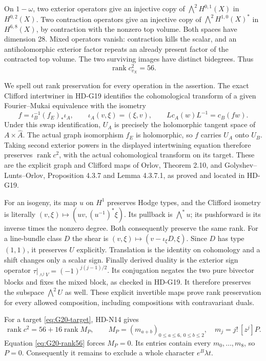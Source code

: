 On \(1-\omega\), two exterior operators give an injective copy of
\(\bigwedge^2H^{0,1}(X)\) in \(H^{0,2}(X)\). Two contraction
operators give an injective copy of
\(\bigwedge^2H^{1,0}(X)^*\) in \(H^{6,8}(X)\), by contraction
with the nonzero top volume. Both spaces have dimension 28. Mixed
operators vanish: contraction kills the scalar, and an antiholomorphic
exterior factor repeats an already present factor of the contracted
top volume. The two surviving images have distinct bidegrees. Thus
\begin{equation}\label{eq:G20-rank56}
                  \operatorname{rank}c^2_{v_X}=56.
\end{equation}

We spell out rank preservation for every operation in the assertion.
The exact Clifford intertwiner in HD-G19 identifies the cohomological
transform of a given Fourier--Mukai equivalence with the isometry
\[
 f=\iota_B^{-1}(f_E)_*\iota_A,
 \qquad \iota_A(v,\xi)=(\xi,v),
 \qquad Lc_A(w)L^{-1}=c_B(fw).
\]
Under this swap identification, \(U_A\) is precisely the holomorphic
tangent space of \(A\times\widehat A\). The actual graph isomorphism
\(f_E\) is holomorphic, so \(f\) carries \(U_A\) onto \(U_B\).
Taking second exterior powers in the displayed intertwining equation
therefore preserves \(\operatorname{rank}c^2\), with the actual
cohomological transform on its target. These are the explicit graph
and Clifford maps of Orlov, Theorem 2.10, and
Golyshev--Lunts--Orlov, Proposition 4.3.7 and Lemma 4.3.7.1,
as proved and located in HD-G19.

For an isogeny, its map \(u\) on \(H^1\) preserves Hodge types,
and the Clifford isometry is literally
\((v,\xi)\mapsto(uv,(u^{-1})^*\xi)\). Its pullback is
\(\bigwedge^*u\); its pushforward is its inverse times the nonzero
degree. Both consequently preserve the same rank. For a line-bundle
class \(D\) the shear is
\((v,\xi)\mapsto(v-\iota_\xi D,\xi)\). Since \(D\) has type
\((1,1)\), it preserves \(U\) explicitly. Translation is the
identity on cohomology and a shift changes only a scalar sign.
Finally derived duality is the exterior sign operator
\(\tau|_{\wedge^jV}=(-1)^{j(j-1)/2}\). Its conjugation negates
the two pure bivector blocks and fixes the mixed block, as checked in
HD-G19. It therefore preserves the subspace \(\bigwedge^2U\) as
well. These explicit invertible maps prove rank preservation for every
allowed composition, including compositions with contravariant duals.

For a target \eqref{eq:G20-target}, HD-N14 gives
\[
 \operatorname{rank}c^2=56+16\operatorname{rank}M_P,
 \qquad
 M_P=(m_{a+b})_{0\le a\le6,\ 0\le b\le2},
 \quad m_j=j!\,[z^j]P.
\]
Equation \eqref{eq:G20-rank56} forces \(M_P=0\). Its entries
contain every \(m_0,\ldots,m_8\), so \(P=0\). Consequently it
remains to exclude a whole character \(e^B\lambda t\).

